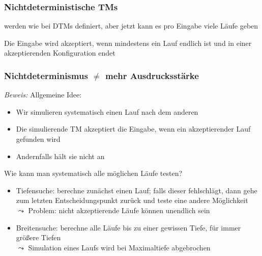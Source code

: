 \documentclass[aspectratio=1610,onlymath]{beamer}
\begin{document}
\begin{frame}\frametitle{Nichtdeterministische TMs}

\medskip

 werden wie bei DTMs definiert, aber jetzt kann es pro Eingabe viele Läufe geben
\medskip

Die Eingabe wird akzeptiert, wenn mindestens ein Lauf endlich ist und in einer akzeptierenden Konfiguration endet

\end{frame}

\begin{frame}[t]\frametitle{Nichtdeterminismus $\neq$ mehr Ausdrucksstärke}

\pause

\emph{Beweis:} Allgemeine Idee:
\begin{itemize}
\item Wir simulieren systematisch einen Lauf nach dem anderen
\item Die simulierende TM akzeptiert die Eingabe, wenn ein akzeptierender Lauf gefunden wird
\item Andernfalls hält sie nicht an
\end{itemize}\pause

\alert{Wie kann man systematisch alle möglichen Läufe testen?}
\begin{itemize}
\item Tiefensuche: berechne zunächst einen Lauf; falls dieser fehlschlägt, dann gehe zum letzten Entscheidungspunkt zurück und teste eine andere Möglichkeit\\\pause
$\leadsto$ Problem: nicht akzeptierende Läufe können unendlich sein\pause
%
\item Breitensuche: berechne alle Läufe bis zu einer gewissen Tiefe, für immer größere Tiefen\\
$\leadsto$ Simulation eines Laufs wird bei Maximaltiefe abgebrochen
\end{itemize}

\end{frame}
\end{document}
